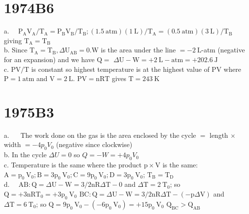 \begin{enumerate}
\section*{1974B6}
a. $\quad \mathrm{P}_{\mathrm{A}} \mathrm{V}_{\mathrm{A}} / \mathrm{T}_{\mathrm{A}}=\mathrm{P}_{\mathrm{B}} \mathrm{V}_{\mathrm{B}} / \mathrm{T}_{\mathrm{B}} ;(1.5 \mathrm{~atm})(1 \mathrm{~L}) / \mathrm{T}_{\mathrm{A}}=(0.5 \mathrm{~atm})(3 \mathrm{~L}) / \mathrm{T}_{\mathrm{B}}$ giving $\mathrm{T}_{\mathrm{A}}=\mathrm{T}_{\mathrm{B}}$\\
b. Since $\mathrm{T}_{\mathrm{A}}=\mathrm{T}_{\mathrm{B}}, \Delta \mathrm{U}_{\mathrm{AB}}=0 . \mathrm{W}$ is the area under the line $=-2 \mathrm{~L}$-atm (negative for an expansion) and we have $\mathrm{Q}=$ $\Delta \mathrm{U}-\mathrm{W}=+2 \mathrm{~L}-\mathrm{atm}=+202.6 \mathrm{~J}$\\
c. $\mathrm{PV} / \mathrm{T}$ is constant so highest temperature is at the highest value of PV where $\mathrm{P}=1 \mathrm{~atm}$ and $\mathrm{V}=2 \mathrm{~L}$. $\mathrm{PV}=\mathrm{nRT}$ gives $\mathrm{T}=243 \mathrm{~K}$

\section*{1975B3}
a. $\quad$ The work done on the gas is the area enclosed by the cycle $=$ length $\times$ width $=-4 p_{0} V_{0}$ (negative since clockwise)\\
b. In the cycle $\Delta U=0$ so $Q=-W=+4 p_{0} V_{0}$\\
c. Temperature is the same where the product $\mathrm{p} \times \mathrm{V}$ is the same: $\mathrm{A}=\mathrm{p}_{0} \mathrm{~V}_{0} ; \mathrm{B}=3 \mathrm{p}_{0} \mathrm{~V}_{0} ; \mathrm{C}=9 \mathrm{p}_{0} \mathrm{~V}_{0} ; \mathrm{D}=3 \mathrm{p}_{0} \mathrm{~V}_{0}$; $\mathrm{T}_{\mathrm{B}}=\mathrm{T}_{\mathrm{D}}$\\
d. $\quad \mathrm{AB}: \mathrm{Q}=\Delta \mathrm{U}-\mathrm{W}=3 / 2 \mathrm{nR} \Delta \mathrm{T}-0$ and $\Delta \mathrm{T}=2 \mathrm{~T}_{0}$; so $\mathrm{Q}=+3 \mathrm{nRT}_{0}=+3 \mathrm{p}_{0} \mathrm{~V}_{0}$ $\mathrm{BC}: \mathrm{Q}=\Delta \mathrm{U}-\mathrm{W}=3 / 2 \mathrm{nR} \Delta \mathrm{T}-(-\mathrm{p} \Delta \mathrm{V})$ and $\Delta \mathrm{T}=6 \mathrm{~T}_{0}$; so $\mathrm{Q}=9 \mathrm{p}_{0} \mathrm{~V}_{0}-\left(-6 \mathrm{p}_{0} \mathrm{~V}_{0}\right)=+15 \mathrm{p}_{0} \mathrm{~V}_{0}$ $\mathrm{Q}_{\mathrm{BC}}>\mathrm{Q}_{\mathrm{AB}}$


\end{enumerate}
